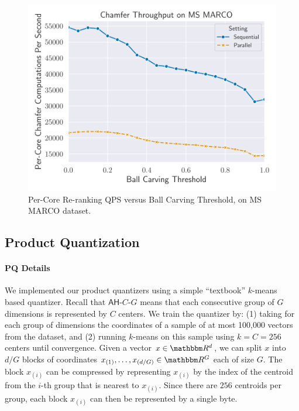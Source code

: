 \begin{figure}
    \centering
    \includegraphics[scale = 0.4]{plots/BallCarvingQPS.pdf}
    \caption{Per-Core Re-ranking QPS versus Ball Carving Threshold, on MS MARCO dataset.}
    \label{fig:BallCarveQPS}
\end{figure}





\subsection{Product Quantization}\label{apx:PQ}
\paragraph{PQ Details} We implemented our product quantizers using a simple ``textbook'' $k$-means based quantizer. Recall that $\mathsf{AH}\text{-}C\text{-}G$ means that each consecutive group of $G$ dimensions is represented by $C$ centers. We train the quantizer by: (1) taking for each group of dimensions the coordinates of a sample of at most 100,000 vectors from the dataset, and (2) running $k$-means on this sample using $k=C=256$ centers until convergence. Given a vector $x \in \R^d$, we can split $x$ into $d/G$ blocks of coordinates $x_{(1)},\dots,x_{(d/G)} \in \R^G$ each of size $G$. The block $x_{(i)}$ can be compressed by representing $x_{(i)}$ by the index of the centroid from the $i$-th group that is nearest to $x_{(i)}$. Since there are $256$ centroids per group, each block $x_{(i)}$ can then be represented by a single byte.


